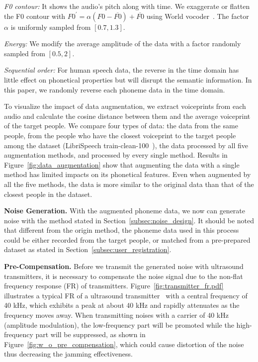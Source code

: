 \textit{F0 contour:} It shows the audio's pitch along with time. We exaggerate or flatten the F0 contour with $F0^{'} = \alpha(F0 - \overline{F0}) + \overline{F0}$ using World vocoder~\cite{world_vocoder}. The factor $\alpha$ is uniformly sampled from $[0.7, 1.3]$.

\textit{Energy:} We modify the average amplitude of the data with a factor randomly sampled from $[0.5, 2]$.

\textit{Sequential order:} For human speech data, the reverse in the time domain has little effect on phonetical properties but will disrupt the semantic information. In this paper, we randomly reverse each phoneme data in the time domain.

To visualize the impact of data augmentation, we extract voiceprints from each audio and calculate the cosine distance between them and the average voiceprint of the target people.
We compare four types of data: the data from the same people, from the people who have the closest voiceprint to the target people among the dataset (LibriSpeech train-clean-100~\cite{LibriSpeech}), the data processed by all five augmentation methods, and processed by every single method. Results in Figure~\ref{fig:data_augmentation} show that augmenting the data with a single method has limited impacts on its phonetical features. Even when augmented by all the five methods, the data is more similar to the original data than that of the closest people in the dataset. 

\textbf{Noise Generation.} With the augmented phoneme data, we now can generate noise with the method stated in Section~\ref{subsec:noise_design}. It should be noted that different from the origin method, the phoneme data used in this process could be either recorded from the target people, or matched from a pre-prepared dataset as stated in Section~\ref{subsec:user_registration}.

\textbf{Pre-Compensation.} Before we transmit the generated noise with ultrasound transmitters, it is necessary to compensate the noise signal due to the non-flat frequency response (FR) of transmitters. Figure~\ref{fig:transmitter_fr.pdf} illustrates a typical FR of a ultrasound transmitter~\cite{jinci} with a central frequency of 40 kHz, which exhibits a peak at about 40 kHz and rapidly attenuates as the frequency moves away. When transmitting noises with a carrier of 40 kHz (amplitude modulation), the low-frequency part will be promoted while the high-frequency part will be suppressed, as shown in Figure~\ref{fig:w_o_pre_compensation}, which could cause distortion of the noise thus decreasing the jamming effectiveness.

